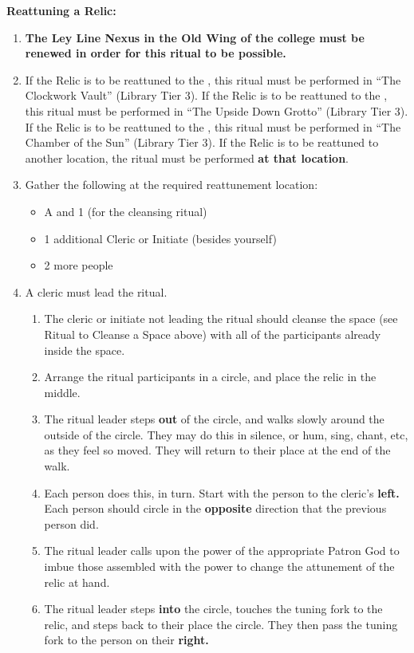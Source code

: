 \documentclass[green]{GL2020}
\begin{document}
\textbf{Reattuning a Relic:}
  \begin{enumerate}
    \item \textbf{The Ley Line Nexus in the Old Wing of the college must be renewed in order for this ritual to be possible.}
    \item If the Relic is to be reattuned to the \pTech{}, this ritual must be performed in “The Clockwork Vault” (Library Tier 3). If the Relic is to be reattuned to the \pShip{}, this ritual must be performed in “The Upside Down Grotto” (Library Tier 3). If the Relic is to be reattuned to the \pFarm{}, this ritual must be performed in “The Chamber of the Sun” (Library Tier 3). If the Relic is to be reattuned to another location, the ritual must be performed \textbf{at that location}.

    \item Gather the following at the required reattunement location:
    \begin{itemize}
      \item A \iTuningFork{} and 1 \iRitualCandle{} (for the cleansing ritual)
      \item 1 additional Cleric or Initiate (besides yourself)
      \item 2 more people
    \end{itemize}
    \item A cleric must lead the ritual.
    \begin{enumerate}
      \item The cleric or initiate not leading the ritual should cleanse the space (see Ritual to Cleanse a Space above) with all of the participants already inside the space.
      \item Arrange the ritual participants in a circle, and place the relic in the middle.
      \item The ritual leader steps \textbf{out} of the circle, and walks slowly around the outside of the circle. They may do this in silence, or hum, sing, chant, etc, as they feel so moved. They will return to their place at the end of the walk.
      \item Each person does this, in turn. Start with the person to the cleric’s \textbf{left.} Each person should circle in the \textbf{opposite} direction that the previous person did.
      \item The ritual leader calls upon the power of the appropriate Patron God to imbue those assembled with the power to change the attunement of the relic at hand.
      \item The ritual leader steps \textbf{into} the circle, touches the tuning fork to the relic, and steps back to their place the circle. They then pass the tuning fork to the person on their \textbf{right.}

\end{enumerate}
\end{enumerate}
\end{document}
